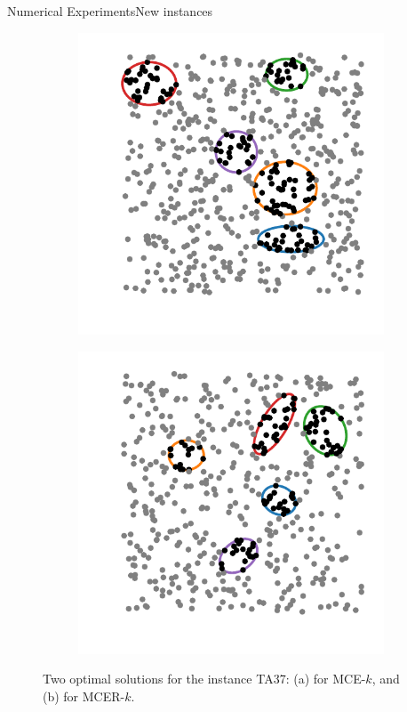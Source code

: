 \documentclass{beamer}
\theoremstyle{definition}
\begin{document}
\begin{frame}{Numerical Experiments}{New instances}
	\begin{figure}
		\begin{subfigure}{.44\textwidth}
			\centering
			\includegraphics[scale=.6]{../article/figures/MCE_TA37}
			\caption{}
			\label{fig:MCE_TA37}
		\end{subfigure}
		\begin{subfigure}{.44\textwidth}
			\centering
			\includegraphics[scale=.6]{../article/figures/MCER_TA37}
			\caption{}
			\label{fig:MCER_TA37}
		\end{subfigure}
		\caption{Two optimal solutions for the instance TA37: (a) for MCE-$k$, and (b) for MCER-$k$.}
		\label{fig:TA37}
	\end{figure}
\end{frame}
\end{document}
